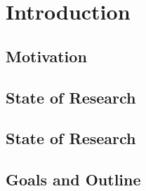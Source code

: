 \chapter{Introduction}\label{chap:introduction}
\thispagestyle{plain}

\section{Motivation} %
\label{sec:motivation}




\section{State of Research} %
\label{sec:state_of_research}

\section{State of Research}\label{1sec:2}



\section{Goals and Outline}\label{1sec:3}



